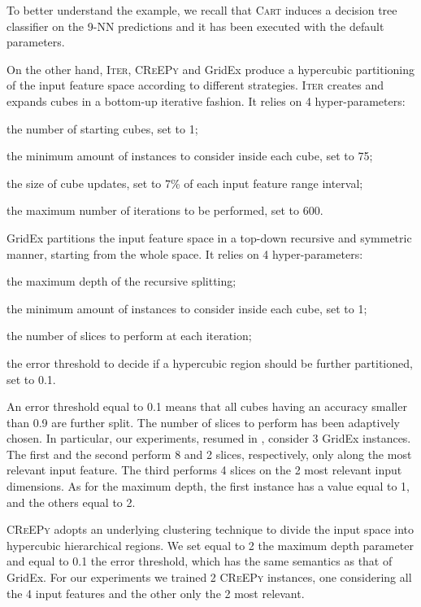 \documentclass{article}
\newcommand{\iter}{\textsc{Iter}}
\newcommand{\gridex}{GridEx}
\newcommand{\creepy}{\textsc{CReEPy}}
\newcommand{\cart}{\textsc{Cart}}
\newenvironment{inlinelist}{\begin{enumerate*}[label=\emph{(\roman{*})}]}{\end{enumerate*}}
\begin{document}
To better understand the example, we recall that \cart{} induces a decision tree classifier on the 9-NN predictions and it has been executed with the default parameters.

On the other hand, \iter{}, \creepy{} and \gridex{} produce a hypercubic partitioning of the input feature space according to different strategies.
%
\iter{} creates and expands cubes in a bottom-up iterative fashion.
%
It relies on 4 hyper-parameters:
%
\begin{inlinelist}
	\item the number of starting cubes, set to 1;
	\item the minimum amount of instances to consider inside each cube, set to 75;
	\item the size of cube updates, set to 7\% of each input feature range interval;
	\item the maximum number of iterations to be performed, set to 600.
\end{inlinelist}

\gridex{} partitions the input feature space in a top-down recursive and symmetric manner, starting from the whole space.
%
It relies on 4 hyper-parameters:
%
\begin{inlinelist}
	\item the maximum depth of the recursive splitting;
	\item the minimum amount of instances to consider inside each cube, set to 1;
	\item the number of slices to perform at each iteration;
	\item the error threshold to decide if a hypercubic region should be further partitioned, set to 0.1.
\end{inlinelist}
%
An error threshold equal to 0.1 means that all cubes having an accuracy smaller than 0.9 are further split.
%
The number of slices to perform has been adaptively chosen.
%
In particular, our experiments, resumed in , consider 3 \gridex{} instances.
%
The first and the second perform 8 and 2 slices, respectively, only along the most relevant input feature.
%
The third performs 4 slices on the 2 most relevant input dimensions.
%
As for the maximum depth, the first instance has a value equal to 1, and the others equal to 2.

\creepy{} adopts an underlying clustering technique to divide the input space into hypercubic hierarchical regions.
%
We set equal to 2 the maximum depth parameter and equal to 0.1 the error threshold, which has the same semantics as that of \gridex{}.
%
For our experiments we trained 2 \creepy{} instances, one considering all the 4 input features and the other only the 2 most relevant.
\end{document}
